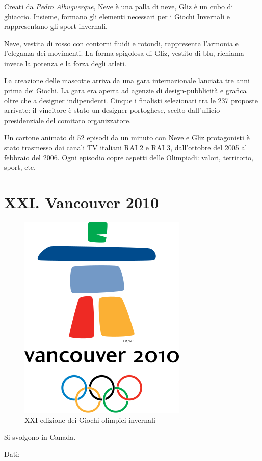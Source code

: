 \documentclass[
]{book}
\begin{document}
Creati da \emph{Pedro Albuquerque}, Neve è una palla di neve, Gliz è un cubo di ghiaccio.
Insieme, formano gli elementi necessari per i Giochi Invernali e rappresentano gli sport invernali.

Neve, vestita di rosso con contorni fluidi e rotondi, rappresenta l'armonia e l'eleganza dei movimenti.
La forma spigolosa di Gliz, vestito di blu, richiama invece la potenza e la forza degli atleti.

La creazione delle mascotte arriva da una gara internazionale lanciata tre anni prima dei Giochi. La gara era aperta ad agenzie di design-pubblicità e grafica oltre che a designer indipendenti. Cinque i finalisti selezionati tra le 237 proposte arrivate: il vincitore è stato un designer portoghese, scelto dall'ufficio presidenziale del comitato organizzatore.

Un cartone animato di 52 episodi da un minuto con Neve e Gliz protagonisti è stato trasmesso dai canali TV italiani RAI 2 e RAI 3, dall'ottobre del 2005 al febbraio del 2006. Ogni episodio copre aspetti delle Olimpiadi: valori, territorio, sport, etc.

\chapter*{XXI. Vancouver 2010}\label{xxi.-vancouver-2010}

\begin{figure}
\includegraphics[width=0.4\linewidth]{images/loghi/2010} \caption{XXI edizione dei Giochi olimpici invernali}\label{fig:unnamed-chunk-79}
\end{figure}

Si svolgono in Canada.

Dati:
\end{document}
